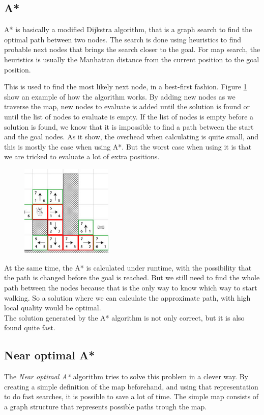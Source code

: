 \documentclass[12 pt]{article} %
\begin{document}
\subsection{A*}
A* is basically a modified Dijkstra algorithm, that is a graph search to find the optimal path between two nodes. 
The search is done using heuristics to find probable next nodes that brings the search closer to the goal. 
For map search, the heuristics is usually the Manhattan distance from the current position to the goal position.

This is used to find the most likely next node, in a best-first fashion.
Figure \ref{fig:astarcat} show an example of how the algorithm works.
By adding new nodes as we traverse the map, new nodes to evaluate is added until the solution is found or until the list of nodes to evaluate is empty.
If the list of nodes is empty before a solution is found, we know that it is impossible to find a path between the start and the goal nodes.
As it show, the overhead when calculating is quite small, and this is mostly the case when using A*.
But the worst case when using it is that we are tricked to evaluate a lot of extra positions.
\begin{figure}
	{\includegraphics[width=0.39\textwidth]{fig/astarcat.jpg}}
	\label{fig:astarcat}
\end{figure}
At the same time, the A* is calculated under runtime, with the possibility that the path is changed before the goal is reached.
But we still need to find the whole path between the nodes because that is the only way to know which way to start walking.
So a solution where we can calculate the approximate path, with high local quality would be optimal.\\

The solution generated by the A* algorithm is not only correct, but it is also found quite fast. 
\subsection{Near optimal A*}
The {\it Near optimal A*} algorithm tries to solve this problem in a clever way.
By creating a simple definition of the map beforehand, and using that representation to do fast searches, it is possible to save a lot of time.
The simple map consists of a graph structure that represents possible paths trough the map.\\
\end{document}
